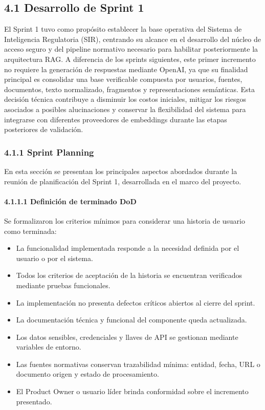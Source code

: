 \documentclass[12pt,a4paper,oneside]{report}
\begin{document}
\subsection{4.1 Desarrollo de Sprint 1}\label{desarrollo-de-sprint-1}

El Sprint 1 tuvo como propósito establecer la base operativa del Sistema
de Inteligencia Regulatoria (SIR), centrando su alcance en el desarrollo
del núcleo de acceso seguro y del pipeline normativo necesario para
habilitar posteriormente la arquitectura RAG. A diferencia de los
sprints siguientes, este primer incremento no requiere la generación de
respuestas mediante OpenAI, ya que su finalidad principal es consolidar
una base verificable compuesta por usuarios, fuentes, documentos, texto
normalizado, fragmentos y representaciones semánticas. Esta decisión
técnica contribuye a disminuir los costos iniciales, mitigar los riesgos
asociados a posibles alucinaciones y conservar la flexibilidad del
sistema para integrarse con diferentes proveedores de embeddings durante
las etapas posteriores de validación.

\subsubsection{4.1.1 Sprint Planning}\label{sprint-planning}

En esta sección se presentan los principales aspectos abordados durante
la reunión de planificación del Sprint 1, desarrollada en el marco del
proyecto.

\paragraph{4.1.1.1 Definición de terminado
DoD}\label{definiciuxf3n-de-terminado-dod}

Se formalizaron los criterios mínimos para considerar una historia de
usuario como terminada:

\begin{itemize}
\item
  La funcionalidad implementada responde a la necesidad definida por el
  usuario o por el sistema.
\item
  Todos los criterios de aceptación de la historia se encuentran
  verificados mediante pruebas funcionales.
\item
  La implementación no presenta defectos críticos abiertos al cierre del
  sprint.
\item
  La documentación técnica y funcional del componente queda actualizada.
\item
  Los datos sensibles, credenciales y llaves de API se gestionan
  mediante variables de entorno.
\item
  Las fuentes normativas conservan trazabilidad mínima: entidad, fecha,
  URL o documento origen y estado de procesamiento.
\item
  El Product Owner o usuario líder brinda conformidad sobre el
  incremento presentado.
\end{itemize}
\end{document}
